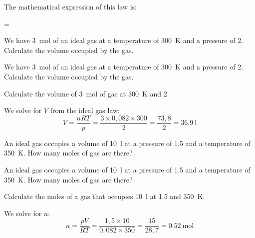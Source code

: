 The mathematical expression of this law is:
\vspace{20pt}
\begin{centeredequation}
    \cdot
    =
    \cdot
    \cdot
\end{centeredequation}
\vspace{25pt}
\begin{exercise}
    We have \qty{3}{\mole} of an ideal gas at a temperature of \qty{300}{\kelvin} and a pressure of \qty{2}{\atmosphere}. Calculate the volume occupied by the gas.
    \begin{solu}
        We have \qty{3}{\mole} of an ideal gas at a temperature of \qty{300}{\kelvin} and a pressure of \qty{2}{\atmosphere}. Calculate the volume occupied by the gas.

        Calculate the volume of \qty{3}{\mole} of gas at \qty{300}{\kelvin} and \qty{2}{\atmosphere}.

        We solve for \( V \) from the ideal gas law:
        \begin{equation*}
            V = \dfrac{nRT}{p} = \dfrac{3 \times 0{,}082 \times 300}{2} = \dfrac{73{,}8}{2} = \qty{36.9}{\litre}
        \end{equation*}
    \end{solu}
\end{exercise}
\begin{exercise}
    An ideal gas occupies a volume of \qty{10}{\litre} at a pressure of \qty{1.5}{\atmosphere} and a temperature of \qty{350}{\kelvin}. How many moles of gas are there?
    \begin{solu}
        An ideal gas occupies a volume of \qty{10}{\litre} at a pressure of \qty{1.5}{\atmosphere} and a temperature of \qty{350}{\kelvin}. How many moles of gas are there?

        Calculate the moles of a gas that occupies \qty{10}{\litre} at \qty{1.5}{\atmosphere} and \qty{350}{\kelvin}.

        We solve for \( n \):
        \begin{equation*}
            n = \dfrac{pV}{RT} = \dfrac{1{,}5 \times 10}{0{,}082 \times 350} = \dfrac{15}{28{,}7} = \qty{0.52}{\mole}
        \end{equation*}
    \end{solu}
\end{exercise}
